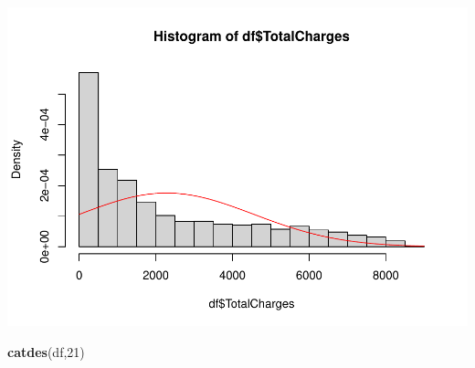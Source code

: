 \documentclass[
]{article}
\newenvironment{Shaded}{\begin{snugshade}}{\end{snugshade}}
\newcommand{\DecValTok}[1]{\textcolor[rgb]{0.00,0.00,0.81}{#1}}
\newcommand{\FunctionTok}[1]{\textcolor[rgb]{0.13,0.29,0.53}{\textbf{#1}}}
\newcommand{\NormalTok}[1]{#1}
\begin{document}
\includegraphics{Assignment2_script_files/figure-latex/unnamed-chunk-24-1.pdf}

\begin{Shaded}
\begin{Highlighting}[]
\FunctionTok{catdes}\NormalTok{(df,}\DecValTok{21}\NormalTok{)}
\end{Highlighting}
\end{Shaded}
\end{document}
